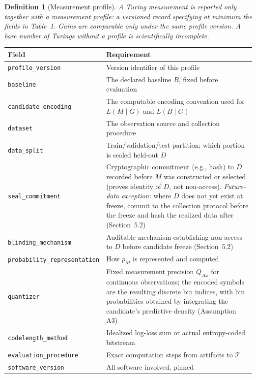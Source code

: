 \documentclass[11pt]{article}
\newtheorem{definition}{Definition}
\begin{document}
\begin{definition}[Measurement profile]
A Turing measurement is reported only together with a measurement profile: a versioned record specifying at minimum the fields in Table~1. Gains are comparable only under the same profile version. A bare number of Turings without a profile is scientifically incomplete.
\end{definition}

\begin{table}[h]
\centering
\small
\setlength{\tabcolsep}{4pt}
\begin{tabularx}{\textwidth}{lY}
\toprule
\textbf{Field} & \textbf{Requirement} \\
\midrule
\texttt{profile\_version} & Version identifier of this profile \\
\texttt{baseline} & The declared baseline \(B\), fixed before evaluation \\
\texttt{candidate\_encoding} & The computable encoding convention used for \(L(M\mid G)\) and \(L(B\mid G)\) \\
\texttt{dataset} & The observation source and collection procedure \\
\texttt{data\_split} & Train/validation/test partition; which portion is sealed held-out \(D\) \\
\texttt{seal\_commitment} & Cryptographic commitment (e.g., hash) to \(D\) recorded before \(M\) was constructed or selected (proves identity of \(D\), not non-access). \textit{Future-data exception:} where \(D\) does not yet exist at freeze, commit to the collection protocol before the freeze and hash the realized data after (Section~5.2) \\
\texttt{blinding\_mechanism} & Auditable mechanism establishing non-access to \(D\) before candidate freeze (Section~5.2) \\
\texttt{probability\_representation} & How \(p_M\) is represented and computed \\
\texttt{quantizer} & Fixed measurement precision \(Q_{\Delta x}\) for continuous observations; the encoded symbols are the resulting discrete bin indices, with bin probabilities obtained by integrating the candidate's predictive density (Assumption A3) \\
\texttt{codelength\_method} & Idealized log-loss sum or actual entropy-coded bitstream \\
\texttt{evaluation\_procedure} & Exact computation steps from artifacts to \(\mathcal{T}\) \\
\texttt{software\_version} & All software involved, pinned \\

\end{tabularx}
\end{table}
\end{document}
